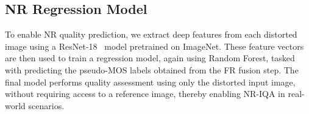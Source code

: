 \subsection{NR Regression Model}

To enable NR quality prediction, we extract deep features from each distorted image using a ResNet-18~\cite{resnet} model pretrained on ImageNet. These feature vectors are then used to train a regression model, again using Random Forest, tasked with predicting the pseudo-MOS labels obtained from the FR fusion step. The final model performs quality assessment using only the distorted input image, without requiring access to a reference image, thereby enabling NR-IQA in real-world scenarios.
